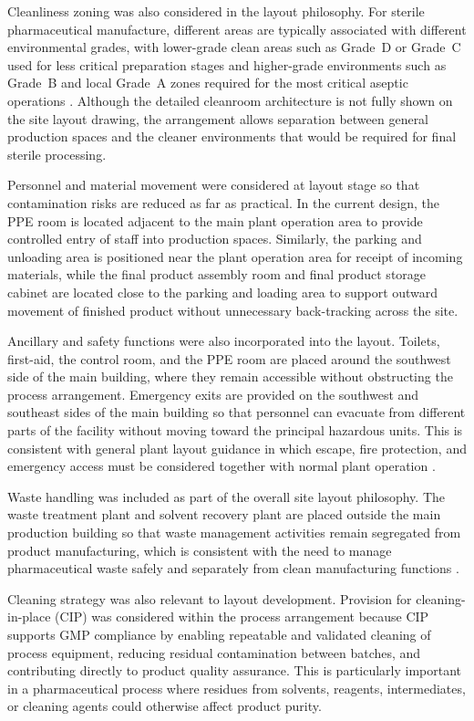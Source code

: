 Cleanliness zoning was also considered in the layout philosophy. For sterile pharmaceutical manufacture, different areas are typically associated with different environmental grades, with lower-grade clean areas such as Grade~D or Grade~C used for less critical preparation stages and higher-grade environments such as Grade~B and local Grade~A zones required for the most critical aseptic operations \cite{Mecart_GradeABCD}. Although the detailed cleanroom architecture is not fully shown on the site layout drawing, the arrangement allows separation between general production spaces and the cleaner environments that would be required for final sterile processing.

Personnel and material movement were considered at layout stage so that contamination risks are reduced as far as practical. In the current design, the PPE room is located adjacent to the main plant operation area to provide controlled entry of staff into production spaces. Similarly, the parking and unloading area is positioned near the plant operation area for receipt of incoming materials, while the final product assembly room and final product storage cabinet are located close to the parking and loading area to support outward movement of finished product without unnecessary back-tracking across the site.

Ancillary and safety functions were also incorporated into the layout. Toilets, first-aid, the control room, and the PPE room are placed around the southwest side of the main building, where they remain accessible without obstructing the process arrangement. Emergency exits are provided on the southwest and southeast sides of the main building so that personnel can evacuate from different parts of the facility without moving toward the principal hazardous units. This is consistent with general plant layout guidance in which escape, fire protection, and emergency access must be considered together with normal plant operation \cite{Lees_2012}.

Waste handling was included as part of the overall site layout philosophy. The waste treatment plant and solvent recovery plant are placed outside the main production building so that waste management activities remain segregated from product manufacturing, which is consistent with the need to manage pharmaceutical waste safely and separately from clean manufacturing functions \cite{NHS_PharmaWaste}.

Cleaning strategy was also relevant to layout development. Provision for cleaning-in-place (CIP) was considered within the process arrangement because CIP supports GMP compliance by enabling repeatable and validated cleaning of process equipment, reducing residual contamination between batches, and contributing directly to product quality assurance. This is particularly important in a pharmaceutical process where residues from solvents, reagents, intermediates, or cleaning agents could otherwise affect product purity.

